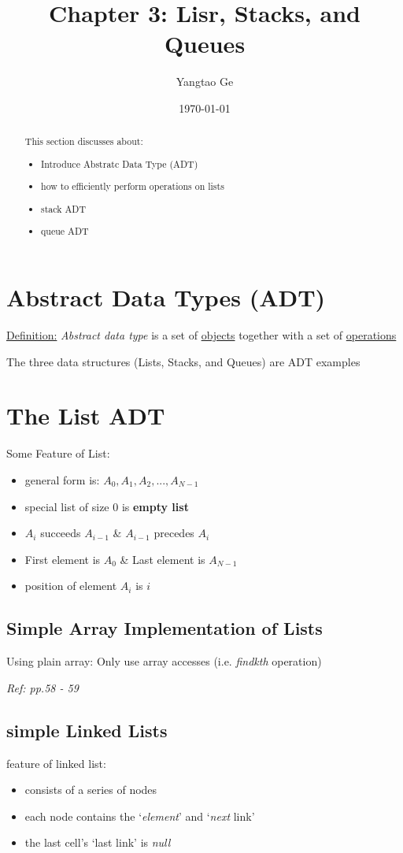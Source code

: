 \documentclass[12pt]{article}
\title{Chapter 3: Lisr, Stacks, and Queues}
\author{Yangtao Ge}
\date{\today}
\theoremstyle{definition}
\begin{document}
\maketitle
\begin{abstract}
This section discusses about:
\begin{itemize}
    \item Introduce Abstratc Data Type (ADT)
    \item how to efficiently perform operations on lists 
    \item stack ADT
    \item queue ADT
\end{itemize}
\end{abstract}

\section{Abstract Data Types (ADT)}
\underline{Definition:} \emph{Abstract data type} is a set of \underline{objects} together with
a set of \underline{operations}

The three data structures (Lists, Stacks, and Queues) are ADT examples

\section{The List ADT}
Some Feature of List:
\begin{itemize}
    \item general form is: $A_0, A_1,A_2, ..., A_{N-1}$
    \item special list of size 0 is \textbf{empty list}
    \item $A_i$ succeeds $A_{i-1}$ \& $A_{i-1}$ precedes $A_i$
    \item First element is $A_0$ \& Last element is $A_{N-1}$
    \item position  of element $A_i$ is $i$
\end{itemize}
\subsection{Simple Array Implementation of Lists}
Using plain array: Only use array accesses (i.e. \emph{findkth} operation)

\textit{Ref: pp.58 - 59}

\subsection{simple Linked Lists}
feature of linked list:
\begin{itemize}
    \item consists of a series of nodes 
    \item each node contains the `\emph{element}' and `\emph{next} link'
    \item the last cell's `last link' is \emph{null}
\end{itemize}
\end{document}
